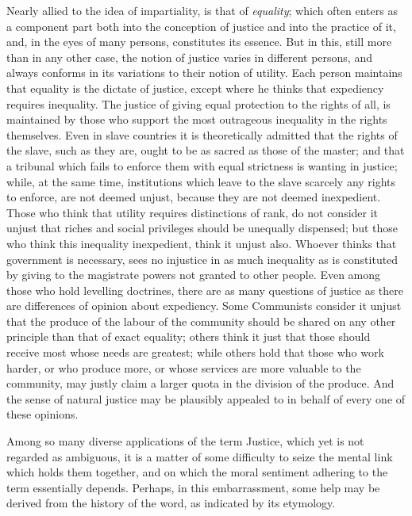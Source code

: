 \documentclass[12pt]{report}
\begin{document}
Nearly allied to the idea of impartiality, is that of \emph{equality}; which often enters as a component part both into the conception of justice and into the practice of it, and, in the eyes of many persons, constitutes its essence. But in this, still more than in any other case, the notion of justice varies in different persons, and always conforms in its variations to their notion of utility. Each person maintains that equality is the dictate of justice, except where he thinks that expediency requires inequality. The justice of giving equal protection to the rights of all, is maintained by those who support the most outrageous inequality in the rights themselves. Even in slave countries it is theoretically admitted that the rights of the slave, such as they are, ought to be as sacred as those of the master; and that a tribunal which fails to enforce them with equal strictness is wanting in justice; while, at the same time, institutions which leave to the slave scarcely any rights to enforce, are not deemed unjust, because they are not deemed inexpedient. Those who think that utility requires distinctions of rank, do not consider it unjust that riches and social privileges should be unequally dispensed; but those who think this inequality inexpedient, think it unjust also. Whoever thinks that government is necessary, sees no injustice in as much inequality as is constituted by giving to the magistrate powers not granted to other people. Even among those who hold levelling doctrines, there are as many questions of justice as there are differences of opinion about expediency. Some Communists consider it unjust that the produce of the labour of the community should be shared on any other principle than that of exact equality; others think it just that those should receive most whose needs are greatest; while others hold that those who work harder, or who produce more, or whose services are more valuable to the community, may justly claim a larger quota in the division of the produce. And the sense of natural justice may be plausibly appealed to in behalf of every one of these opinions.

Among so many diverse applications of the term Justice, which yet is not regarded as ambiguous, it is a matter of some difficulty to seize the mental link which holds them together, and on which the moral sentiment adhering to the term essentially depends. Perhaps, in this embarrassment, some help may be derived from the history of the word, as indicated by its etymology.
\end{document}
